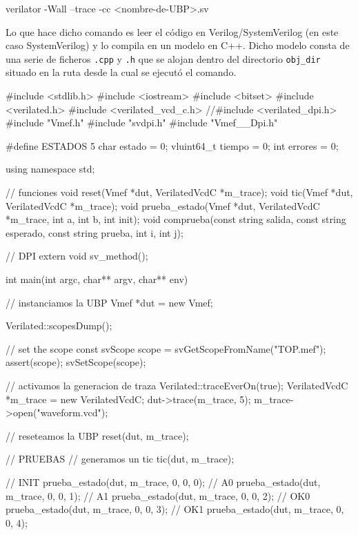 \begin{lcverbatim}
verilator -Wall --trace -cc <nombre-de-UBP>.sv
\end{lcverbatim}

Lo que hace dicho comando es leer el código en Verilog/SystemVerilog (en este caso SystemVerilog) y lo compila en un modelo en C++. Dicho modelo consta de una serie de ficheros \verb|.cpp| y \verb|.h| que se alojan dentro del directorio \verb|obj_dir| situado en la ruta desde la cual se ejecutó el comando.

\begin{mycode}[style=verilogstyle, caption={Banco de pruebas en C++ que se simula con Verilator.}, label=lst:mef-verilator]
    #include <stdlib.h>
    #include <iostream>
    #include <bitset>
    #include <verilated.h>
    #include <verilated_vcd_c.h>
    //#include <verilated_dpi.h>
    #include "Vmef.h"
    #include "svdpi.h"
    #include "Vmef__Dpi.h"
    
    #define ESTADOS 5
    char estado = 0;
    vluint64_t tiempo = 0;
    int errores = 0;
    
    using namespace std;
    
    // funciones
    void reset(Vmef *dut, VerilatedVcdC *m_trace);
    void tic(Vmef *dut, VerilatedVcdC *m_trace);
    void prueba_estado(Vmef *dut, VerilatedVcdC *m_trace, int a, int b, int init);
    void comprueba(const string salida, const string esperado, const string prueba, int i, int j);
    
    // DPI
    extern void sv_method();
    
    int main(int argc, char** argv, char** env) {
        // instanciamos la UBP
        Vmef *dut = new Vmef;
    
        Verilated::scopesDump();
    
        // set the scope
        const svScope scope = svGetScopeFromName("TOP.mef");
        assert(scope);
        svSetScope(scope);
    
        // activamos la generacion de traza
        Verilated::traceEverOn(true);
        VerilatedVcdC *m_trace = new VerilatedVcdC;
        dut->trace(m_trace, 5);
        m_trace->open("waveform.vcd");
    
        // reseteamos la UBP
        reset(dut, m_trace);
    
        // PRUEBAS 
        // generamos un tic
        tic(dut, m_trace);
    
        // INIT
        prueba_estado(dut, m_trace, 0, 0, 0);
        // A0
        prueba_estado(dut, m_trace, 0, 0, 1);
        // A1
        prueba_estado(dut, m_trace, 0, 0, 2);
        // OK0
        prueba_estado(dut, m_trace, 0, 0, 3);
        // OK1
        prueba_estado(dut, m_trace, 0, 0, 4);
    
}
\end{mycode}
